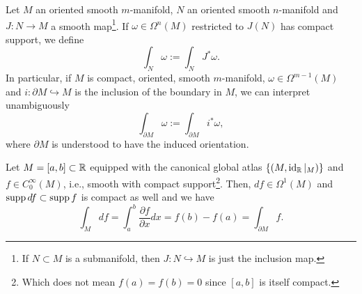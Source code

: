 \begin{definition}\label{def:insm}
	Let $M$ an oriented smooth $m$-manifold, $N$ an oriented smooth $n$-manifold and $J:N\to M$ a smooth map\footnote{If $N\subset M$ is a submanifold, then $J:N\hookrightarrow M$ is just the inclusion map.}.
	If $\omega\in\Omega^n(M)$ restricted to $J(N)$ has compact support, we define
	\begin{equation}
		\int_N \omega := \int_N J^*\omega.
	\end{equation}
	In particular, if $M$ is compact, oriented, smooth $m$-manifold, $\omega\in\Omega^{m-1}(M)$ and $i:\partial M\hookrightarrow M$ is the inclusion of the boundary in $M$, we can interpret unambiguously
	\begin{equation}
		\int_{\partial M} \omega := \int_{\partial M} i^* \omega,
	\end{equation}
	where $\partial M$ is understood to have the induced orientation.
\end{definition}

\begin{example}\label{ex:intint}
	Let $M=[a,b]\subset \mathbb{R}$ equipped with the canonical global atlas $\{(M, \operatorname{id}_{\mathbb{R}}|_M)\}$ and $f\in C^\infty_0(M)$, i.e., smooth with compact support\footnote{Which does not mean $f(a) = f(b)=0$ since $[a,b]$ is itself compact.}.
	Then, $df\in\Omega^1(M)$ and $\operatorname{supp} df \subset \operatorname{supp} f$ is compact as well and we have
	\begin{equation}
		\int_M df = \int_a^b \frac{\partial f}{\partial x} dx = f(b)- f(a) = \int_{\partial M} f.
	\end{equation}
\end{example}


